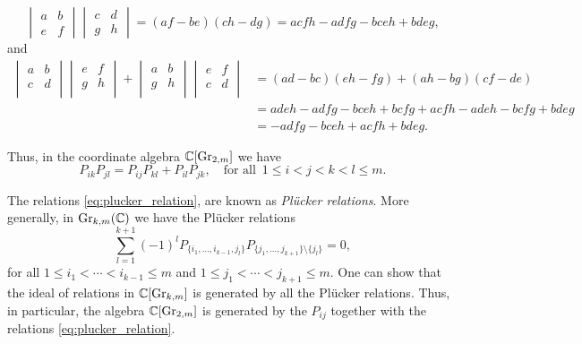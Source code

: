 \begin{example}
	\begin{equation*}
		\begin{vmatrix}
			a & b \\
			e & f
		\end{vmatrix}
		\begin{vmatrix}
			c & d \\
			g & h
		\end{vmatrix}
		=
		(af - be)(ch -dg) = acfh - adfg - bceh + bdeg,
	\end{equation*}
	and
	\begin{align*}
		\begin{vmatrix}
			a & b \\
			c & d \\
		\end{vmatrix}
		\begin{vmatrix}
			e & f \\
			g & h \\
		\end{vmatrix}
		+
		\begin{vmatrix}
			a & b \\
			g & h \\
		\end{vmatrix}
		\begin{vmatrix}
			e & f \\
			c & d \\
		\end{vmatrix} & =
		(ad-bc)(eh-fg) + (ah-bg)(cf-de)                                                       \\
		                            & = adeh - adfg - bceh + bcfg + acfh - adeh - bcfg + bdeg \\
		                            & = -adfg - bceh + acfh + bdeg.
	\end{align*}

	Thus, in the coordinate algebra $\mathbb{C}[\operatorname{Gr}_{2,m}]$ we have
	\begin{equation}\label{eq:plucker_relation}
		P_{ik}P_{jl} = P_{ij}P_{kl} + P_{il}P_{jk}, \quad \text{for all } \, 1\leq i < j < k < l \leq m.
	\end{equation}
\end{example}

The relations \cref{eq:plucker_relation}, are known as \emph{Plücker
	relations}. More generally, in $\operatorname{Gr}_{k,m}(\mathbb{C})$ we have the
Plücker relations
\begin{equation}\label{eq:plucker_relations_general}
	\sum_{l = 1}^{k + 1} (-1)^l P_{\{i_1, \dots, i_{k - 1}, j_l\}}P_{\{j_1, \dotsc, j_{k+1}\}\setminus \{j_l\}} = 0,
\end{equation}
%
for all $1 \leq i_1 < \dotsb < i_{k-1} \leq m$ and $1 \leq j_1 < \dotsb < j_{k+1} \leq
	m$. One can show that the ideal of relations in $\mathbb{C}[\operatorname{Gr}_{k,m}]$ is generated by all
the Plücker relations. Thus, in particular, the algebra $\mathbb{C}[\operatorname{Gr}_{2,m}]$ is generated
by the $P_{ij}$ together with the relations \cref{eq:plucker_relation}.

